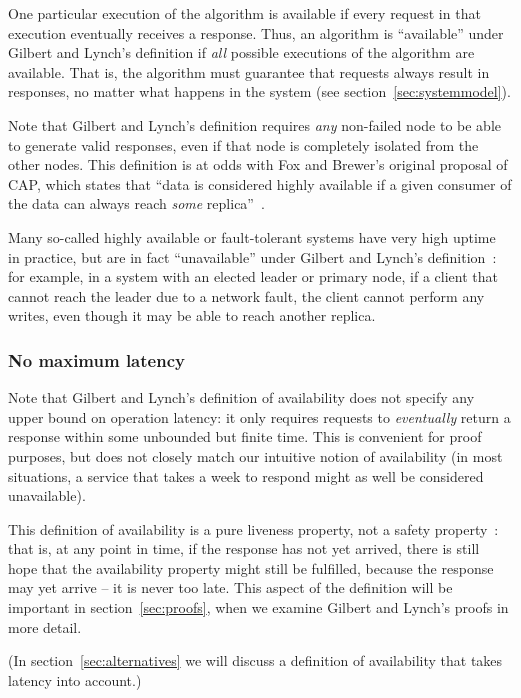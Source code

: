 \documentclass[a4paper,twocolumn,10pt]{article}
\begin{document}
One particular execution of the algorithm is available if every request in that execution eventually
receives a response. Thus, an algorithm is ``available'' under Gilbert and Lynch's definition if
\emph{all} possible executions of the algorithm are available. That is, the algorithm must guarantee
that requests always result in responses, no matter what happens in the system (see
section~\ref{sec:systemmodel}).

Note that Gilbert and Lynch's definition requires \emph{any} non-failed node to be able to generate
valid responses, even if that node is completely isolated from the other nodes. This definition is
at odds with Fox and Brewer's original proposal of CAP, which states that ``data is considered
highly available if a given consumer of the data can always reach \emph{some}
replica''~\cite[emphasis original]{Fox1999bs}.

Many so-called highly available or fault-tolerant systems have very high uptime in practice, but are
in fact ``unavailable'' under Gilbert and Lynch's definition~\cite{Kim1984bl}: for example, in a
system with an elected leader or primary node, if a client that cannot reach the leader due to a
network fault, the client cannot perform any writes, even though it may be able to reach another
replica.

\subsubsection{No maximum latency}\label{sec:no-max-latency}

Note that Gilbert and Lynch's definition of availability does not specify any upper bound on
operation latency: it only requires requests to \emph{eventually} return a response within some
unbounded but finite time. This is convenient for proof purposes, but does not closely match our
intuitive notion of availability (in most situations, a service that takes a week to respond might
as well be considered unavailable).

This definition of availability is a pure liveness property, not a safety
property~\cite{Alpern1985dg}: that is, at any point in time, if the response has not yet arrived,
there is still hope that the availability property might still be fulfilled, because the response
may yet arrive -- it is never too late. This aspect of the definition will be important in
section~\ref{sec:proofs}, when we examine Gilbert and Lynch's proofs in more detail.

(In section~\ref{sec:alternatives} we will discuss a definition of availability that takes latency
into account.)
\end{document}
